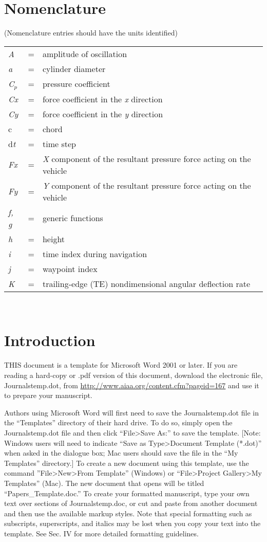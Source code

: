 \documentclass{AIAA}
\begin{document}
\section*{Nomenclature}
(Nomenclature entries should have the units identified)\\
\noindent\begin{tabular}{@{}lcl@{}}
\textit{A}  &=& amplitude of oscillation \\
\textit{a   }&=&    cylinder diameter \\
\textit{C}$_{p}$&=& pressure coefficient \\
\textit{Cx} &=& force coefficient in the \textit{x} direction \\
\textit{Cy} &=& force coefficient in the \textit{y} direction \\
c   &=& chord \\
d\textit{t} &=& time step \\
\textit{Fx} &=& \textit{X} component of the resultant pressure force acting on the vehicle \\
\textit{Fy} &=& \textit{Y} component of the resultant pressure force acting on the vehicle \\
\textit{f, g}   &=& generic functions \\
\textit{h}  &=& height \\
\textit{i}  &=& time index during navigation \\
\textit{j}  &=& waypoint index \\
\textit{K}  &=& trailing-edge (TE) nondimensional angular deflection rate
\end{tabular} \\

\section{Introduction}
THIS document is a template for Microsoft Word 2001 or later. If you are reading a hard-copy or .pdf version of this document, download the electronic file, Journalstemp.dot, from \url{http://www.aiaa.org/content.cfm?pageid=167} and use it to prepare your manuscript.

Authors using Microsoft Word will first need to save the Journalstemp.dot file in the ``Templates'' directory of their hard drive. To do so, simply open the Journalstemp.dot file and then click ``File>Save As:'' to save the template. [Note: Windows users will need to indicate ``Save as Type>Document Template (*.dot)'' when asked in the dialogue box; Mac users should save the file in the ``My Templates'' directory.] To create a new document using this template, use the command ''File>New>From Template'' (Windows) or ``File>Project Gallery>My Templates'' (Mac). The new document that opens will be titled ``Papers\_Template.doc.'' To create your formatted manuscript, type your own text over sections of Journalstemp.doc, or cut and paste from another document and then use the available markup styles. Note that special formatting such as subscripts, superscripts, and italics may be lost when you copy your text into the template. See Sec. IV for more detailed formatting guidelines.
\end{document}
